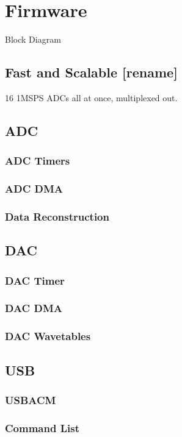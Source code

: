 \chapter{Firmware}
Block Diagram

\section{Fast and Scalable [rename]}
16 1MSPS ADCs all at once, multiplexed out.

\section{ADC}
\subsection{ADC Timers}
\subsection{ADC DMA}
\subsection{Data Reconstruction}

\section{DAC}
\subsection{DAC Timer}
\subsection{DAC DMA}
\subsection{DAC Wavetables}

\section{USB}
\subsection{USBACM}
\subsection{Command List}
